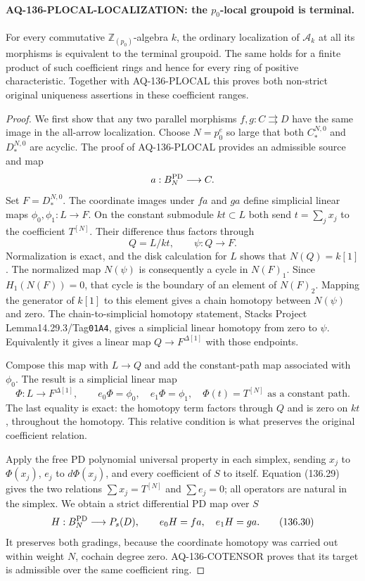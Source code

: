 \paragraph{AQ-136-PLOCAL-LOCALIZATION: the $p_0$-local groupoid is terminal.}
For every commutative $\mathbb Z_{(p_0)}$-algebra $k$, the
ordinary localization of $\mathcal A_k$ at all its morphisms
is equivalent to the terminal groupoid.  The same holds
for a finite product of such coefficient rings and hence
for every ring of positive characteristic.  Together with
AQ-136-PLOCAL this proves both non-strict original
uniqueness assertions in these coefficient ranges.

\begin{proof}
We first show that any two parallel morphisms
$f,g:C\rightrightarrows D$ have the same image in the
all-arrow localization.  Choose $N=p_0^e$ so large that
both $C_*^{N,0}$ and $D_*^{N,0}$ are acyclic.  The proof
of AQ-136-PLOCAL provides an admissible source and map
\[
                         a:B_N^{\rm PD}\longrightarrow C.
\]
Set $F=D_*^{N,0}$.  The coordinate images under $fa$ and
$ga$ define simplicial linear maps
$\phi_0,\phi_1:L\to F$.  On the constant submodule
$kt\subset L$ both send $t=\sum_jx_j$ to the coefficient
$T^{[N]}$.  Their difference thus factors through
\[
             Q=L/kt,\qquad \psi:Q\longrightarrow F.        \tag{136.28}
\]
Normalization is exact, and the disk calculation for $L$
shows that $N(Q)=k[1]$.
The normalized map $N(\psi)$ is consequently a cycle in
$N(F)_1$.  Since $H_1(N(F))=0$, that cycle is the boundary
of an element of $N(F)_2$.  Mapping the generator of
$k[1]$ to this element gives a chain homotopy between
$N(\psi)$ and zero.  The chain-to-simplicial homotopy
statement, Stacks Project Lemma14.29.3/Tag\texttt{01A4},
gives a simplicial linear homotopy from zero to $\psi$.
Equivalently it gives a linear map
$Q\to F^{\Delta[1]}$ with those endpoints.

Compose this map with $L\to Q$ and add the constant-path
map associated with $\phi_0$.  The result is a simplicial
linear map
\[
 \Phi:L\longrightarrow F^{\Delta[1]},\qquad
 e_0\Phi=\phi_0,\quad e_1\Phi=\phi_1,\quad
 \Phi(t)=T^{[N]}\text{ as a constant path}.                 \tag{136.29}
\]
The last equality is exact: the homotopy term factors
through $Q$ and is zero on $kt$, throughout the homotopy.
This relative condition is what preserves the original
coefficient relation.

Apply the free PD polynomial universal property in each
simplex, sending $x_j$ to $\Phi(x_j)$, $e_j$ to
$d\Phi(x_j)$, and every coefficient of $S$ to itself.
Equation (136.29) gives the two relations
$\sum x_j=T^{[N]}$ and $\sum e_j=0$; all operators are
natural in the simplex.  We obtain a strict differential
PD map over $S$
\[
 H:B_N^{\rm PD}\longrightarrow P_s(D),\qquad
                         e_0H=fa,\quad e_1H=ga.            \tag{136.30}
\]
It preserves both gradings, because the coordinate
homotopy was carried out within weight $N$, cochain
degree zero.  AQ-136-COTENSOR proves that its target is
admissible over the same coefficient ring.


\end{proof}

